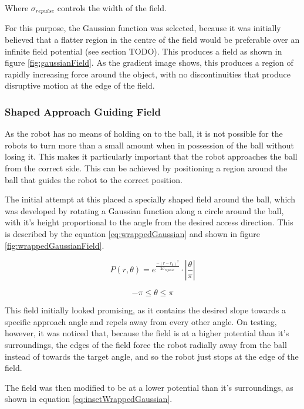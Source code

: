 \documentclass[10pt]{article} \usepackage[a4paper]{geometry}
\begin{document}
Where $\sigma_{repulse}$ controls the width of the field.

For this purpose, the Gaussian function was selected, because it was initially
believed that a flatter region in the centre of the field would be preferable
over an infinite field potential (see section TODO). This produces a field as
shown in figure \ref{fig:gaussianField}. As the gradient image shows, this
produces a region of rapidly increasing force around the object, with no
discontinuities that produce disruptive motion at the edge of the field.

\subsubsection{Shaped Approach Guiding Field\label{sub:Shaped-Approach-Guiding}}

As the robot has no means of holding on to the ball, it is not possible for the
robots to turn more than a small amount when in possession of the ball without
losing it. This makes it particularly important that the robot approaches the
ball from the correct side. This can be achieved by positioning a region around
the ball that guides the robot to the correct position.

The initial attempt at this placed a specially shaped field around the ball,
which was developed by rotating a Gaussian function along a circle around the
ball, with it's height proportional to the angle from the desired access
direction. This is described by the equation \ref{eq:wrappedGaussian} and shown
in figure \ref{fig:wrappedGaussianField}.

\begin{equation}
P\left(r,\theta\right)=e^{\frac{-\left(r-r_{0}\right)^{2}}{2\sigma_{repulse}}}\cdot\left|\frac{\theta}{\pi}\right|\label{eq:wrappedGaussian}
\end{equation}

\[
-\pi\leq\theta\leq\pi
\]

This field initially looked promising, as it contains the desired slope towards
a specific approach angle and repels away from every other angle. On testing,
however, it was noticed that, because the field is at a higher potential than
it's surroundings, the edges of the field force the robot radially away from the
ball instead of towards the target angle, and so the robot just stops at the
edge of the field.

The field was then modified to be at a lower potential than it's surroundings,
as shown in equation \ref{eq:insetWrappedGaussian}.
\end{document}
